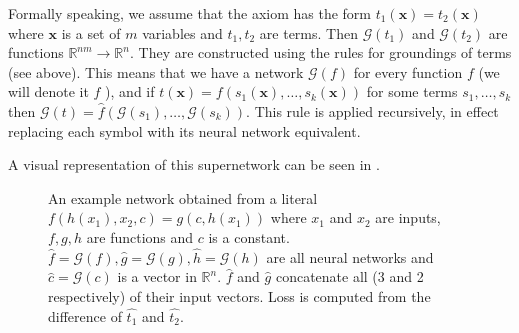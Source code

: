 Formally speaking, we assume that the axiom has the form $t_1(\textbf{x})=t_2(\textbf{x})$ where $\textbf{x}$ is a set of $m$ variables and $t_1,t_2$ are terms. Then $\mathcal{G}(t_1)$ and $\mathcal{G}(t_2)$ are functions $\mathbb{R}^{nm}\rightarrow\mathbb{R}^n$. They are constructed using the rules for groundings of terms (see above). This means that we have a network $\mathcal{G}(f)$ for every function $f$ (we will denote it $\widehat{f}$ ), and if $t(\textbf{x})=f(s_1(\textbf{x}),\dots,s_k(\textbf{x}))$ for some terms $s_1,\dots,s_k$ then $\mathcal{G}(t)=\widehat{f}(\mathcal{G}(s_1),\dots,\mathcal{G}(s_k))$. This rule is applied recursively, in effect replacing each symbol with its neural network equivalent.

A visual representation of this supernetwork can be seen in .\\

\begin{figure}
\caption{An example network obtained from a literal $f(h(x_1),x_2,c)=g(c,h(x_1))$ where $x_1$ and $x_2$ are inputs, $f,g,h$ are functions and $c$ is a constant. $\widehat{f}=\mathcal{G}(f),\widehat{g}=\mathcal{G}(g),\widehat{h}=\mathcal{G}(h)$ are all neural networks and $\widehat{c}=\mathcal{G}(c)$ is a vector in $\mathbb{R}^n$. $\widehat{f}$ and $\widehat{g}$ concatenate all (3 and 2 respectively) of their input vectors. Loss is computed from the difference of $\widehat{t_1}$ and $\widehat{t_2}$.}
\centering
\label{nndiagram2}
\end{figure}

